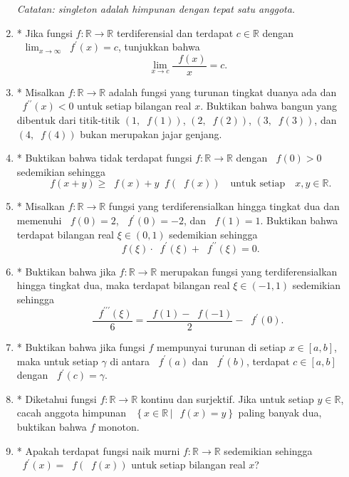 \documentclass[12pt]{article}
\newcommand*\func[2]{\mathop{}\!{#1}{\left({#2}\right)}}
\newcommand*\set[2]{\mathop{}\!\left\lbrace{{#1} \, \left| \, {#2} \right.}\right\rbrace}
\newcommand*\ds[1]{\mathop{}\!\displaystyle{{#1}}}
\begin{document}
\begin{enumerate}[leftmargin=*]
		\textit{Catatan: singleton adalah himpunan dengan tepat satu anggota.}
		\item* Jika fungsi $ f : \mathbb{R} \to \mathbb{R} $ terdiferensial dan terdapat $ c \in \mathbb{R} $ dengan $ \ds{\lim_{x \to \infty}{\func{f^{\prime}}{x}}} = c $, tunjukkan bahwa
		\[ \lim_{x \to c}{\frac{\func{f}{x}}{x}} = c. \]
		\item* Misalkan $ f : \mathbb{R} \to \mathbb{R} $ adalah fungsi yang turunan tingkat duanya ada dan $ \func{f^{\prime\prime}}{x} < 0 $ untuk setiap bilangan real $ x $. Buktikan bahwa bangun yang dibentuk dari titik-titik $ \left(1, \func{f}{1}\right) $, $ \left(2, \func{f}{2}\right) $, $ \left(3, \func{f}{3}\right) $, dan $ \left(4, \func{f}{4}\right) $ bukan merupakan jajar genjang.
		\item* Buktikan bahwa tidak terdapat fungsi $ f : \mathbb{R} \to \mathbb{R} $ dengan $ \func{f}{0} > 0 $ sedemikian sehingga
		\[ \func{f}{x + y} \geq \func{f}{x} + y\func{f}{\func{f}{x}} \quad \mbox{untuk setiap} \quad x, y \in \mathbb{R}. \]
		\item* Misalkan $ f : \mathbb{R} \to \mathbb{R} $ fungsi yang terdiferensialkan hingga tingkat dua dan memenuhi $ \func{f}{0} = 2 $, $ \func{f^{\prime}}{0} = -2 $, dan $ \func{f}{1} = 1 $. Buktikan bahwa terdapat bilangan real $ \xi \in \left(0, 1\right) $ sedemikian sehingga
		\[ \func{f}{\xi} \cdot \func{f^{\prime}}{\xi} + \func{f^{\prime\prime}}{\xi} = 0. \]
		\item* Buktikan bahwa jika $ f : \mathbb{R} \to \mathbb{R} $ merupakan fungsi yang terdiferensialkan hingga tingkat dua, maka terdapat bilangan real $ \xi \in \left(-1, 1\right) $ sedemikian sehingga
		\[ \frac{\func{f^{\prime\prime\prime}}{\xi}}{6} = \frac{\func{f}{1} - \func{f}{-1}}{2} - \func{f^{\prime}}{0}. \]
		\item* Buktikan bahwa jika fungsi $ f $ mempunyai turunan di setiap $ x \in \left[a, b\right] $, maka untuk setiap $ \gamma $ di antara $ \func{f^{\prime}}{a} $ dan $ \func{f^{\prime}}{b} $, terdapat $ c \in \left[a, b\right] $ dengan $ \func{f^{\prime}}{c} = \gamma $.
		\item* Diketahui fungsi $ f: \mathbb{R} \to \mathbb{R} $ kontinu dan surjektif. Jika untuk setiap $ y \in \mathbb{R} $, cacah anggota himpunan $ \set{x \in \mathbb{R}}{\func{f}{x} = y} $ paling banyak dua, buktikan bahwa $ f $ monoton.
		\item* Apakah terdapat fungsi naik murni $ f : \mathbb{R} \to \mathbb{R} $ sedemikian sehingga $ \func{f^{\prime}}{x} = \func{f}{\func{f}{x}} $ untuk setiap bilangan real $ x $?

\end{enumerate}
\end{document}

